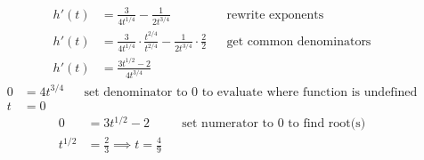 \documentclass{article}
\begin{document}
\begin{description}
\begin{description}
\begin{align*}
                        h'(t) & = \frac{3}{4t^{1/4}} - \frac{1}{2t^{3/4}}                                                 &  & \text{rewrite exponents}       \\[1em]
                        h'(t) & = \frac{3}{4t^{1/4}} \cdot \frac{t^{2/4}}{t^{2/4}} - \frac{1}{2t^{3/4}} \cdot \frac{2}{2} &  & \text{get common denominators} \\[1em]
                        h'(t) & = \frac{3t^{1/2} - 2}{4t^{3/4}}
                    \end{align*}
                    \begin{align*}
                        0 & = 4t^{3/4} &  & \text{set denominator to 0 to evaluate where function is undefined} \\
                        t & = 0
                    \end{align*}
                    \begin{align*}
                        0       & = 3t^{1/2} - 2                          &  & \text{set numerator to 0 to find root(s)} \\[1em]
                        t^{1/2} & = \frac{2}{3} \implies  t = \frac{4}{9}
                    \end{align*}


\end{description}
\end{description}
\end{document}
